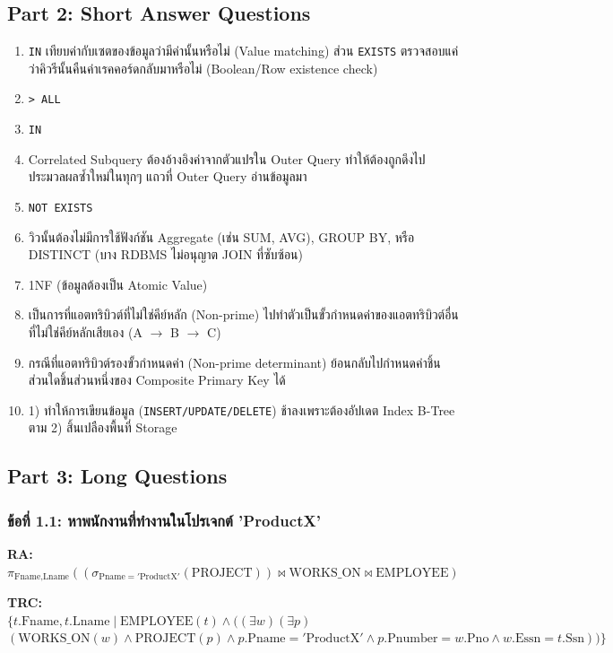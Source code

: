\documentclass[a4paper,12pt]{article}
\begin{document}
\subsection*{Part 2: Short Answer Questions}
\begin{enumerate}[label=\textbf{\arabic*.}]
    \item \texttt{IN} เทียบค่ากับเซตของข้อมูลว่ามีค่านั้นหรือไม่ (Value matching) ส่วน \texttt{EXISTS} ตรวจสอบแค่ว่าคิวรีนั้นคืนค่าเรคคอร์ดกลับมาหรือไม่ (Boolean/Row existence check)
    \item \texttt{> ALL}
    \item \texttt{IN}
    \item Correlated Subquery ต้องอ้างอิงค่าจากตัวแปรใน Outer Query ทำให้ต้องถูกดึงไปประมวลผลซ้ำใหม่ในทุกๆ แถวที่ Outer Query อ่านข้อมูลมา
    \item \texttt{NOT EXISTS}
    \item วิวนั้นต้องไม่มีการใช้ฟังก์ชัน Aggregate (เช่น SUM, AVG), GROUP BY, หรือ DISTINCT (บาง RDBMS ไม่อนุญาต JOIN ที่ซับซ้อน)
    \item 1NF (ข้อมูลต้องเป็น Atomic Value)
    \item เป็นการที่แอตทริบิวต์ที่ไม่ใช่คีย์หลัก (Non-prime) ไปทำตัวเป็นขั้วกำหนดค่าของแอตทริบิวต์อื่นที่ไม่ใช่คีย์หลักเสียเอง (A $\rightarrow$ B $\rightarrow$ C)
    \item กรณีที่แอตทริบิวต์รองขั้วกำหนดค่า (Non-prime determinant) ย้อนกลับไปกำหนดค่าชิ้นส่วนใดชิ้นส่วนหนึ่งของ Composite Primary Key ได้
    \item 1) ทำให้การเขียนข้อมูล (\texttt{INSERT/UPDATE/DELETE}) ช้าลงเพราะต้องอัปเดต Index B-Tree ตาม 2) สิ้นเปลืองพื้นที่ Storage 
\end{enumerate}

\subsection*{Part 3: Long Questions}

\subsubsection*{ข้อที่ 1.1: หาพนักงานที่ทำงานในโปรเจกต์ 'ProductX'}

\textbf{RA:}\\
$ \pi_{\text{Fname}, \text{Lname}} ( (\sigma_{\text{Pname}='\text{ProductX}'}(\text{PROJECT})) \bowtie \text{WORKS\_ON} \bowtie \text{EMPLOYEE}) $

\textbf{TRC:}\\
$ \{ t.\text{Fname}, t.\text{Lname} \mid \text{EMPLOYEE}(t) \land ((\exists w)(\exists p) $ \\
$ (\text{WORKS\_ON}(w) \land \text{PROJECT}(p) \land p.\text{Pname}='\text{ProductX}' \land p.\text{Pnumber}=w.\text{Pno} \land w.\text{Essn}=t.\text{Ssn})) \} $
\end{document}
